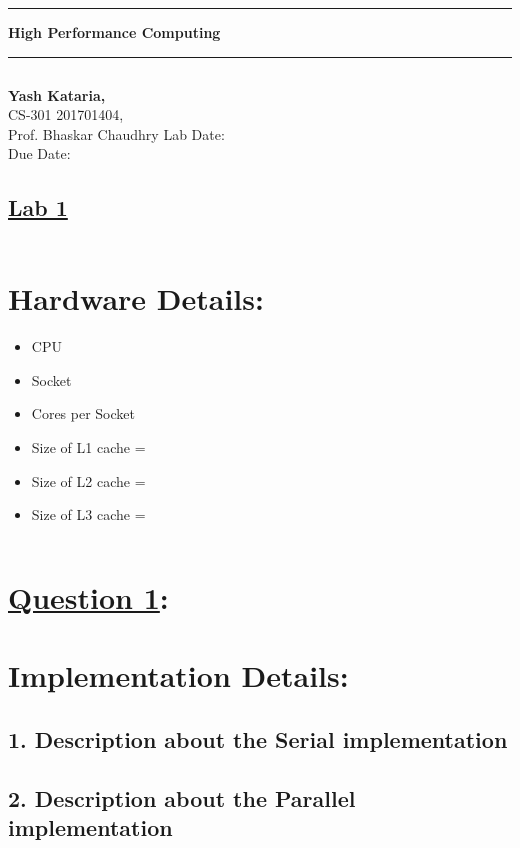 \documentclass[a4paper, 11pt]{article}
\begin{document}
\par\noindent\rule{\textwidth}{0.5pt}
\begin{center}
\Huge\textbf{High Performance Computing}
\end{center}
\par\noindent\rule{\textwidth}{0.5pt}
$$$$

\noindent
\hfill \textbf{Yash Kataria, } \\
\normalsize CS-301 \hfill 201701404, \\
Prof. Bhaskar Chaudhry \hfill Lab Date: \\
\hfill Due Date: \\

\begin{center}
\section*{\Huge{\underline{Lab 1}}}
\end{center}
$$$$

\section*{Hardware Details:}

\begin{itemize}
    \item CPU
    \item Socket
    \item Cores per Socket
    \item Size of L1 cache = 
    \item Size of L2 cache =
    \item Size of L3 cache =
\end{itemize}


$$$$
$$$$


\section*{\underline{\LARGE{Question 1}}: \LARGE{}}

\section*{Implementation Details:}
\subsection*{1. Description about the Serial implementation}

\subsection*{2. Description about the Parallel implementation}
$$$$
\end{document}
